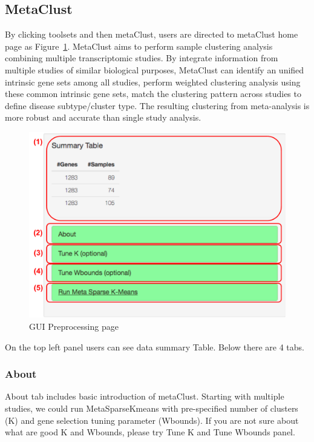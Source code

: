\subsection{MetaClust}
By clicking toolsets and then metaClust,
users are directed to metaClust home page as Figure~\ref{fig:metaClustHome}.
MetaClust \citep{huo2016meta} aims to perform sample clustering analysis combining multiple transcriptomic studies.
By integrate information from multiple studies of similar biological purposes,
MetaClust can identify an unified intrinsic gene sets among all studies, perform weighted clustering analysis using these common intrinsic gene sets,
match the clustering pattern across studies to define disease subtype/cluster type.
The resulting clustering from meta-analysis is more robust and accurate than single study analysis.


\begin{figure}[H]
\begin{center}
\includegraphics[scale=0.35]{./figure/metaClust/metaClustHome}
\caption{GUI Preprocessing page}
\label{fig:metaClustHome}
\end{center}
\end{figure}
On the top left panel users can see data summary Table.
Below there are 4 tabs.
\subsubsection{About}
About tab includes basic introduction of metaClust.
Starting with multiple studies, 
we could run MetaSparseKmeans with pre-specified number of clusters (K) and gene selection tuning parameter (Wbounds).
If you are not sure about what are good K and Wbounds, please try Tune K and Tune Wbounds panel.

